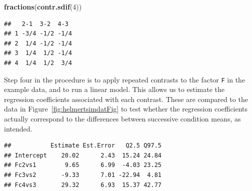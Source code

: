 \documentclass[12pt,]{krantz}
\newenvironment{Shaded}{\begin{snugshade}}{\end{snugshade}}
\newcommand{\KeywordTok}[1]{\textcolor[rgb]{0.13,0.29,0.53}{\textbf{#1}}}
\newcommand{\DataTypeTok}[1]{\textcolor[rgb]{0.13,0.29,0.53}{#1}}
\newcommand{\DecValTok}[1]{\textcolor[rgb]{0.00,0.00,0.81}{#1}}
\newcommand{\StringTok}[1]{\textcolor[rgb]{0.31,0.60,0.02}{#1}}
\newcommand{\OperatorTok}[1]{\textcolor[rgb]{0.81,0.36,0.00}{\textbf{#1}}}
\newcommand{\NormalTok}[1]{#1}
\theoremstyle{definition}
\theoremstyle{definition}
\theoremstyle{definition}
\theoremstyle{remark}
\begin{document}
\begin{Shaded}
\begin{Highlighting}[]
\KeywordTok{fractions}\NormalTok{(}\KeywordTok{contr.sdif}\NormalTok{(}\DecValTok{4}\NormalTok{))}
\end{Highlighting}
\end{Shaded}

\begin{verbatim}
##   2-1  3-2  4-3 
## 1 -3/4 -1/2 -1/4
## 2  1/4 -1/2 -1/4
## 3  1/4  1/2 -1/4
## 4  1/4  1/2  3/4
\end{verbatim}

Step four in the procedure is to apply repeated contrasts to the factor
\texttt{F} in the example data, and to run a linear model. This allows
us to estimate the regression coefficients associated with each
contrast. These are compared to the data in
Figure~\ref{fig:helmertsimdatFig} to test whether the regression
coefficients actually correspond to the differences between successive
condition means, as intended.

\begin{Shaded}
\end{Shaded}

\begin{verbatim}
##           Estimate Est.Error   Q2.5 Q97.5
## Intercept    20.02      2.43  15.24 24.84
## Fc2vs1        9.65      6.99  -4.03 23.25
## Fc3vs2       -9.33      7.01 -22.94  4.81
## Fc4vs3       29.32      6.93  15.37 42.77
\end{verbatim}
\end{document}
